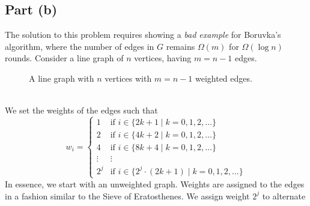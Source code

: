 \documentclass[9pt]{article}
\begin{document}
\subsection*{Part (b)}
The solution to this problem requires showing a \textit{bad example} for Boruvka's algorithm,
where the number of edges in $G$ remains $\Omega(m)$ for $\Omega(\log{n})$ rounds. Consider a
line graph of $n$ vertices, having $m = n - 1$ edges.
\begin{figure}[htbp]
    \centering
    \caption{A line graph with $n$ vertices with $m = n-1$ weighted edges.}
\end{figure}
\vspace*{0pt} \\
We set the weights of the edges such that
\begin{equation}
    \label{eq:weights-line}
    w_{i} = \begin{cases}
        1 & \text{if } i \in \{ 2k + 1 \mid k = 0, 1, 2, \dots \} \\
        2 & \text{if } i \in \{ 4k + 2 \mid k = 0, 1, 2, \dots \} \\
        4 & \text{if } i \in \{ 8k + 4 \mid k = 0, 1, 2, \dots \} \\
        \vdots & \vdots \\
        2^{j} & \text{if } i \in \{ 2^{j} \cdot (2k + 1) \mid k = 0, 1, 2, \dots \}
    \end{cases}
\end{equation}
In essence, we start with an unweighted graph. Weights are assigned to the edges in a
fashion similar to the Sieve of Eratosthenes. We assign weight $2^{j}$ to alternate
\end{document}
